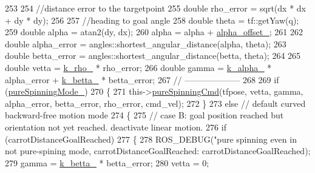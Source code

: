 \begin{DoxyCode}
253 
254             \textcolor{comment}{//distance error to the targetpoint}
255             \textcolor{keywordtype}{double} rho\_error = sqrt(dx * dx + dy * dy);
256 
257             \textcolor{comment}{//heading to goal angle}
258             \textcolor{keywordtype}{double} theta = tf::getYaw(q);
259             \textcolor{keywordtype}{double} alpha = atan2(dy, dx);
260             alpha = alpha + \hyperlink{classcl__move__base__z_1_1backward__local__planner_1_1BackwardLocalPlanner_a09765b08935d9355447c44776e1b1c3a}{alpha\_offset\_};
261 
262             \textcolor{keywordtype}{double} alpha\_error = angles::shortest\_angular\_distance(alpha, theta);
263             \textcolor{keywordtype}{double} betta\_error = angles::shortest\_angular\_distance(betta, theta);
264 
265             \textcolor{keywordtype}{double} vetta = \hyperlink{classcl__move__base__z_1_1backward__local__planner_1_1BackwardLocalPlanner_ad8a36184bfb011545c751109e23d3b98}{k\_rho\_} * rho\_error;
266             \textcolor{keywordtype}{double} gamma = \hyperlink{classcl__move__base__z_1_1backward__local__planner_1_1BackwardLocalPlanner_abf7a5a56de2ee41afba7e63c0628ec35}{k\_alpha\_} * alpha\_error + \hyperlink{classcl__move__base__z_1_1backward__local__planner_1_1BackwardLocalPlanner_a9f257183d87f1d732cb7e404f09905ad}{k\_betta\_} * betta\_error;
267             \textcolor{comment}{// --------------------}
268 
269             \textcolor{keywordflow}{if} (\hyperlink{classcl__move__base__z_1_1backward__local__planner_1_1BackwardLocalPlanner_aebc89ccfa79fdf6bd45ba35134bec3fb}{pureSpinningMode\_})
270             \{
271                 this->\hyperlink{classcl__move__base__z_1_1backward__local__planner_1_1BackwardLocalPlanner_aaa88a0a47e7cfd449c59518577599928}{pureSpinningCmd}(tfpose, vetta, gamma, alpha\_error, betta\_error, 
      rho\_error, cmd\_vel);
272             \}
273             \textcolor{keywordflow}{else} \textcolor{comment}{// default curved backward-free motion mode}
274             \{
275                 \textcolor{comment}{// case B: goal position reached but orientation not yet reached. deactivate linear motion.}
276                 \textcolor{keywordflow}{if} (carrotDistanceGoalReached)
277                 \{
278                     ROS\_DEBUG(\textcolor{stringliteral}{"pure spinning even in not pure-spining mode, carrotDistanceGoalReached: %
       carrotDistanceGoalReached);
279                     gamma = \hyperlink{classcl__move__base__z_1_1backward__local__planner_1_1BackwardLocalPlanner_a9f257183d87f1d732cb7e404f09905ad}{k\_betta\_} * betta\_error;
280                     vetta = 0;
}
\end{DoxyCode}
